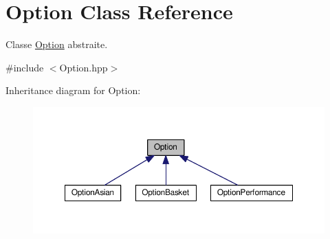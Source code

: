 \hypertarget{classOption}{\section{Option Class Reference}
\label{classOption}
}


Classe \hyperlink{classOption}{Option} abstraite.  




{\ttfamily \#include $<$Option.\-hpp$>$}



Inheritance diagram for Option\-:
\nopagebreak
\begin{figure}[H]
\begin{center}
\leavevmode
\includegraphics[width=350pt]{classOption__inherit__graph}
\end{center}
\end{figure}
